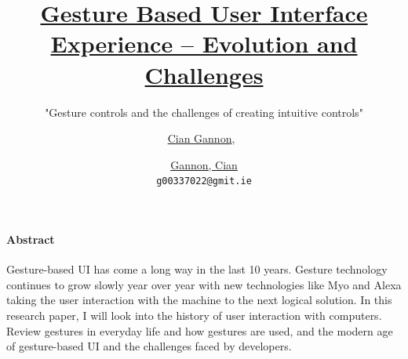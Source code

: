 \documentclass[a4paper]{scrreprt}
\title{\href{https://github.com/cian2009/GestureReview}{Gesture Based User Interface Experience – Evolution and Challenges}}
\subtitle{"Gesture controls and the challenges of creating intuitive controls"}
\author{\href{https://github.com/cian2009}{Cian Gannon},~\IEEEmembership{Software Development (Honours),~GMIT}}
\author{
  \href{https://github.com/cian2009}{Gannon, Cian}\\
  \texttt{g00337022@gmit.ie}
}
\begin{document}
\maketitle

\tableofcontents


\pagebreak

\paragraph{Abstract}
Gesture-based UI has come a long way in the last 10 years. Gesture technology continues to grow slowly year over year with new technologies like Myo and Alexa taking the user interaction with the machine to the next logical solution. In this research paper, I will look into the history of user interaction with computers. Review gestures in everyday life and how gestures are used, and the modern age of gesture-based UI and the challenges faced by developers.







\printbibliography
\end{document}
